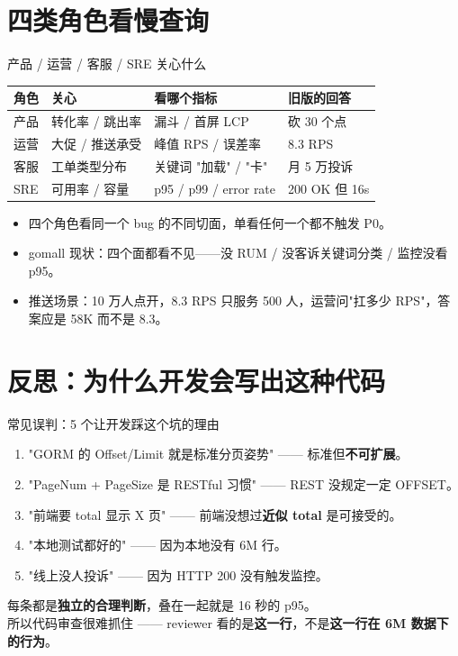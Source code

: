 \section{四类角色看慢查询}

\begin{frame}{产品 / 运营 / 客服 / SRE 关心什么}
\begin{tabular}{@{}llll@{}}
\toprule
角色 & 关心 & 看哪个指标 & 旧版的回答 \\
\midrule
产品  & 转化率 / 跳出率   & 漏斗 / 首屏 LCP        & 砍 30 个点 \\
运营  & 大促 / 推送承受  & 峰值 RPS / 误差率      & 8.3 RPS \\
客服  & 工单类型分布     & 关键词 "加载" / "卡"    & 月 5 万投诉 \\
SRE  & 可用率 / 容量    & p95 / p99 / error rate & 200 OK 但 16s \\
\bottomrule
\end{tabular}
\vspace{2mm}
\begin{itemize}
  \item 四个角色看同一个 bug 的不同切面，单看任何一个都不触发 P0。
  \item gomall 现状：四个面都看不见——没 RUM / 没客诉关键词分类 / 监控没看 p95。
  \item 推送场景：10 万人点开，8.3 RPS 只服务 500 人，运营问"扛多少 RPS"，答案应是 58K 而不是 8.3。
\end{itemize}
\end{frame}


\section{反思：为什么开发会写出这种代码}

\begin{frame}{常见误判：5 个让开发踩这个坑的理由}
\begin{enumerate}
  \item "GORM 的 Offset/Limit 就是标准分页姿势" —— 标准但\textbf{不可扩展}。
  \item "PageNum + PageSize 是 RESTful 习惯" —— REST 没规定一定 OFFSET。
  \item "前端要 total 显示 X 页" —— 前端没想过\textbf{近似 total} 是可接受的。
  \item "本地测试都好的" —— 因为本地没有 6M 行。
  \item "线上没人投诉" —— 因为 HTTP 200 没有触发监控。
\end{enumerate}
\vspace{3mm}
\small 每条都是\textbf{独立的合理判断}，叠在一起就是 16 秒的 p95。\\
所以代码审查很难抓住 —— reviewer 看的是\textbf{这一行}，不是\textbf{这一行在 6M 数据下的行为}。
\end{frame}

